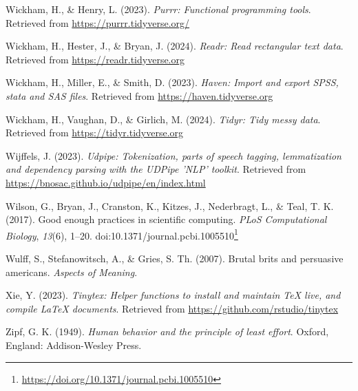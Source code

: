 \documentclass[
  letterpaper,
]{latex/krantz}
\newlength{\cslhangindent}
\newenvironment{CSLReferences}[2] %
 {\begin{list}{}{%
  \setlength{\itemindent}{0pt}
  \setlength{\leftmargin}{0pt}
  \setlength{\parsep}{0pt}
  \ifodd #1
   \setlength{\leftmargin}{\cslhangindent}
   \setlength{\itemindent}{-1\cslhangindent}
  \fi
  \setlength{\itemsep}{#2\baselineskip}}}
 {\end{list}}
\theoremstyle{definition}
\theoremstyle{remark}
\DeclareRobustCommand{\href}[2]{#2\footnote{\url{#1}}}
\begin{document}
\begin{CSLReferences}{1}{0}
Wickham, H., \& Henry, L. (2023). \emph{Purrr: Functional programming
tools}. Retrieved from \url{https://purrr.tidyverse.org/}

Wickham, H., Hester, J., \& Bryan, J. (2024). \emph{Readr: Read
rectangular text data}. Retrieved from \url{https://readr.tidyverse.org}

Wickham, H., Miller, E., \& Smith, D. (2023). \emph{Haven: Import and
export SPSS, stata and SAS files}. Retrieved from
\url{https://haven.tidyverse.org}

Wickham, H., Vaughan, D., \& Girlich, M. (2024). \emph{Tidyr: Tidy messy
data}. Retrieved from \url{https://tidyr.tidyverse.org}

Wijffels, J. (2023). \emph{Udpipe: Tokenization, parts of speech
tagging, lemmatization and dependency parsing with the UDPipe 'NLP'
toolkit}. Retrieved from
\url{https://bnosac.github.io/udpipe/en/index.html}

Wilson, G., Bryan, J., Cranston, K., Kitzes, J., Nederbragt, L., \&
Teal, T. K. (2017). Good enough practices in scientific computing.
\emph{PLoS Computational Biology}, \emph{13}(6), 1--20.
doi:\href{https://doi.org/10.1371/journal.pcbi.1005510}{10.1371/journal.pcbi.1005510}

Wulff, S., Stefanowitsch, A., \& Gries, S. Th. (2007). Brutal brits and
persuasive americans. \emph{Aspects of Meaning}.

Xie, Y. (2023). \emph{Tinytex: Helper functions to install and maintain
TeX live, and compile LaTeX documents}. Retrieved from
\url{https://github.com/rstudio/tinytex}

Zipf, G. K. (1949). \emph{Human behavior and the principle of least
effort}. Oxford, England: Addison-Wesley Press.

\end{CSLReferences}



\printindex
\end{document}
